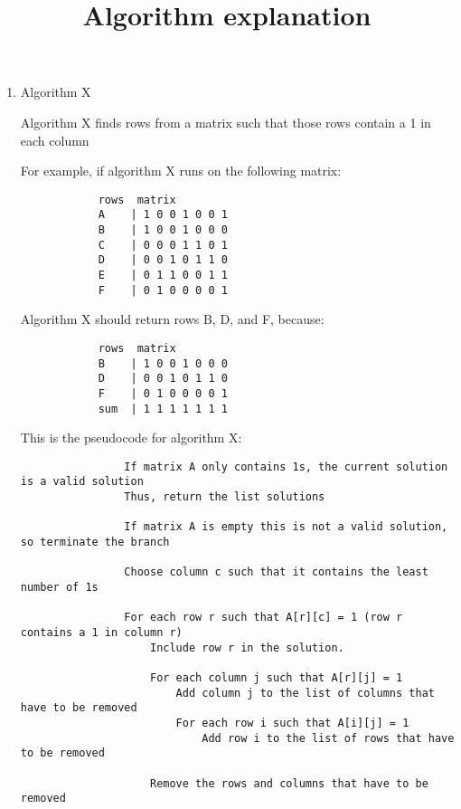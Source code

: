 \documentclass[10pt, a4paper]{article}
\title{Algorithm explanation}
\begin{document}
\maketitle

\begin{enumerate}
	\item Algorithm X

	      Algorithm X finds rows from a matrix such that those rows contain a 1 in each column

	      For example, if algorithm X runs on the following matrix:

	      \begin{lstlisting}
			rows  matrix
			A    | 1 0 0 1 0 0 1
			B    | 1 0 0 1 0 0 0
			C    | 0 0 0 1 1 0 1
			D    | 0 0 1 0 1 1 0
			E    | 0 1 1 0 0 1 1
			F    | 0 1 0 0 0 0 1
		  \end{lstlisting}

	      Algorithm X should return rows B, D, and F, because:

	      \begin{lstlisting}
			rows  matrix
			B    | 1 0 0 1 0 0 0
			D    | 0 0 1 0 1 1 0
			F    | 0 1 0 0 0 0 1
			sum  | 1 1 1 1 1 1 1
		  \end{lstlisting}

	      This is the pseudocode for algorithm X:

	      \begin{mdframed}[backgroundcolor=light-gray, roundcorner=10pt,leftmargin=1, rightmargin=1, innerleftmargin=15, innertopmargin=15,innerbottommargin=15, outerlinewidth=1, linecolor=light-gray]
		      \begin{lstlisting}
				If matrix A only contains 1s, the current solution is a valid solution
				Thus, return the list solutions
				
				If matrix A is empty this is not a valid solution, so terminate the branch

				Choose column c such that it contains the least number of 1s

				For each row r such that A[r][c] = 1 (row r contains a 1 in column r)
					Include row r in the solution.

					For each column j such that A[r][j] = 1
						Add column j to the list of columns that have to be removed
						For each row i such that A[i][j] = 1
							Add row i to the list of rows that have to be removed
					
					Remove the rows and columns that have to be removed 
					

\end{lstlisting}
\end{mdframed}
\end{enumerate}
\end{document}
